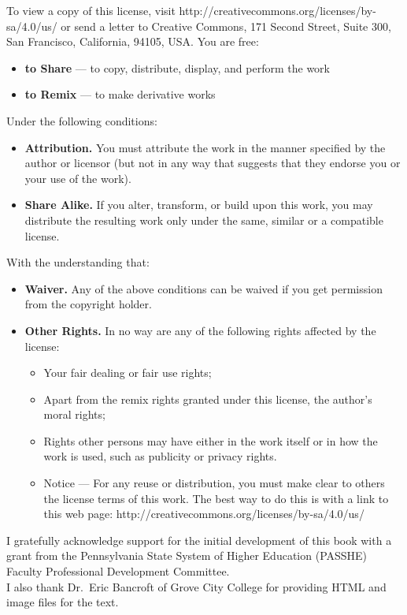 \documentclass{book}
\newcommand{\<}{\left\langle}
\renewcommand{\>}{\right\rangle}
\theoremstyle{definition}
\begin{document}
To view a copy of this license, visit http://creativecommons.org/licenses/by-sa/4.0/us/ or send a letter to Creative Commons, 171 Second Street, Suite 300, San Francisco, California, 94105, USA.
You are free:
\begin{itemize}
	\item {\bf to Share} — to copy, distribute, display, and perform the work
	\item {\bf to Remix} — to make derivative works
\end{itemize}
Under the following conditions:
\begin{itemize}
	\item {\bf Attribution.} You must attribute the work in the manner specified by the author or licensor (but not in any way that suggests that they endorse you or your use of the work).
	\item {\bf Share Alike.} If you alter, transform, or build upon this work, you may distribute the resulting work only under the same, similar or a compatible license.
\end{itemize}
With the understanding that:
\begin{itemize}
	\item {\bf Waiver.} Any of the above conditions can be waived if you get permission from the copyright holder.
	\item {\bf Other Rights.} In no way are any of the following rights affected by the license:
		\begin{itemize}
			\item Your fair dealing or fair use rights;
			\item Apart from the remix rights granted under this license, the author's moral rights;
			\item Rights other persons may have either in the work itself or in how the work is used, such as publicity or privacy rights.
			\item Notice — For any reuse or distribution, you must make clear to others the license terms of this work. The best way to do this is with a link to this web page:
http://creativecommons.org/licenses/by-sa/4.0/us/
\end{itemize}
\end{itemize}
 I gratefully acknowledge support for the initial development of this book with a grant from the Pennsylvania State System of Higher Education (PASSHE) Faculty Professional Development Committee. \\

I also thank Dr.\ Eric Bancroft of Grove City College for providing HTML and image files for the text.\\
\end{document}
